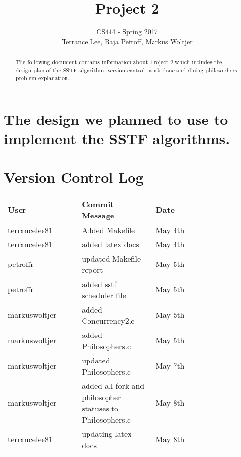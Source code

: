 \documentclass[draftclsnofoot,onecolumn,10pt,compsoc]{IEEEtran}
\begin{document}
\begin{titlepage}
	\title{Project 2}
	\author{CS444 - Spring 2017 \\ Terrance Lee, Raja Petroff, Markus Woltjer}
	\maketitle
	\begin{abstract}
		The following document contains information about Project 2 which includes the design plan of the SSTF algorithm, version control, work done and dining philosophers problem explanation.  
	\end{abstract}
	
	\thispagestyle{empty} %
	
\end{titlepage}

\tableofcontents

\newpage

\section{The design we planned to use to implement the SSTF algorithms.}
\section{Version Control Log}
\begin{center}
	\begin{tabular}{| p{0.3\linewidth} | p{0.3\linewidth} | p{0.3\linewidth} |}
		\hline User & Commit Message & Date\\
		\hline terrancelee81 & Added Makefile & May 4th\\
		\hline terrancelee81 & added latex docs& May 4th\\
		\hline petroffr & updated Makefile report & May 5th \\	
		\hline petroffr & added sstf scheduler file & May 5th \\ 	
		\hline markuswoltjer & added Concurrency2.c & May 5th\\
		\hline markuswoltjer & added Philosophers.c & May 5th\\	
		\hline markuswoltjer & updated Philosophers.c & May 7th\\	
		\hline markuswoltjer & added all fork and philosopher statuses to Philosophers.c & May 8th\\
		\hline terrancelee81 & updating  latex docs & May 8th\\	
	\end{tabular}
\end{center}
\end{document}
